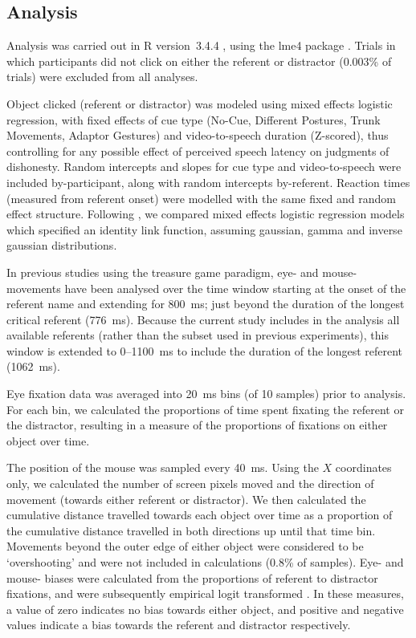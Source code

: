 \documentclass[a4paper,man,natbib]{apa6}
\begin{document}
\subsection{Analysis}
Analysis was carried out in R version~3.4.4 \citep{Rbase2017}, using the lme4 package \citep{Bates2015}. 
Trials in which participants did not click on either the referent or distractor (0.003\% of trials) were excluded from all analyses. 

Object clicked (referent or distractor) was modeled using mixed effects logistic regression, with fixed effects of cue type (No-Cue, Different Postures, Trunk Movements, Adaptor Gestures) and video-to-speech duration (Z-scored), thus controlling for any possible effect of perceived speech latency on judgments of dishonesty. %
Random intercepts and slopes for cue type and video-to-speech were included by-participant, along with random intercepts by-referent.
Reaction times (measured from referent onset) were modelled with the same fixed and random effect structure.
Following \citet{Lo2015}, we compared mixed effects logistic regression models which specified an identity link function, assuming gaussian, gamma and inverse gaussian distributions.

In previous studies using the treasure game paradigm, eye- and mouse- movements have been analysed over the time window starting at the onset of the referent name and extending for 800~ms; just beyond the duration of the longest critical referent (776~ms). 
Because the current study includes in the analysis all available referents (rather than the subset used in previous experiments), this window is extended to 0--1100~ms to include the duration of the longest referent (1062~ms).

Eye fixation data was averaged into 20~ms bins (of 10 samples) prior to analysis.
For each bin, we calculated the proportions of time spent fixating the referent or the distractor, resulting in a measure of the proportions of fixations on either object over time.

The position of the mouse was sampled every 40~ms.
Using the $X$ coordinates only, we calculated the number of screen pixels moved and the direction of movement (towards either referent or distractor).
We then calculated the cumulative distance travelled towards each object over time as a proportion of the cumulative distance travelled in both directions up until that time bin.
Movements beyond the outer edge of either object were considered to be `overshooting' and were not included in calculations (0.8\% of samples).
Eye- and mouse- biases were calculated from the proportions of referent to distractor fixations, and were subsequently empirical logit transformed \citep{Barr2008}. 
In these measures, a value of zero indicates no bias towards either object, and positive and negative values indicate a bias towards the referent and distractor respectively.
\end{document}
